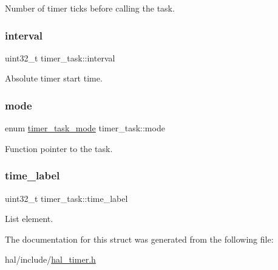 Number of timer ticks before calling the task. \mbox{\label{structtimer__task_a627f11cf534c7c4173e010235a3545ce}} 
\subsubsection{\texorpdfstring{interval}{interval}}
{\footnotesize\ttfamily uint32\+\_\+t timer\+\_\+task\+::interval}

Absolute timer start time. \mbox{\label{structtimer__task_afaa093b08fe0267ae9b66b016b0886e0}} 
\subsubsection{\texorpdfstring{mode}{mode}}
{\footnotesize\ttfamily enum \hyperlink{group__doc__driver__hal__timer_gaca1571cb764dfc6dc97aca691789d53d}{timer\+\_\+task\+\_\+mode} timer\+\_\+task\+::mode}

Function pointer to the task. \mbox{\label{structtimer__task_a862d2aad8a2d1a9c22d108227cbf6c24}} 
\subsubsection{\texorpdfstring{time\+\_\+label}{time\_label}}
{\footnotesize\ttfamily uint32\+\_\+t timer\+\_\+task\+::time\+\_\+label}

List element. 

The documentation for this struct was generated from the following file\+:\begin{DoxyCompactItemize}
\item 
hal/include/\hyperlink{hal__timer_8h}{hal\+\_\+timer.\+h}\end{DoxyCompactItemize}
